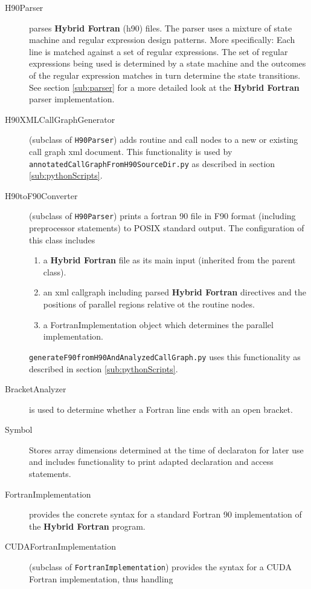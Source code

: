 \begin{description}
 \item[H90Parser] parses \textbf{Hybrid Fortran} (h90) files. The parser uses a mixture of state machine and regular expression design patterns. More specifically: Each line is matched against a set of regular expressions. The set of regular expressions being used is determined by a state machine and the outcomes of the regular expression matches in turn determine the state transitions.
 See section \ref{sub:parser} for a more detailed look at the \textbf{Hybrid Fortran} parser implementation.
 \item[H90XMLCallGraphGenerator] (subclass of \verb|H90Parser|) adds routine and call nodes to a new or existing call graph xml document. This functionality is used by \linebreak
 \verb|annotatedCallGraphFromH90SourceDir.py| as described in section \ref{sub:pythonScripts}.
 \item[H90toF90Converter] (subclass of \verb|H90Parser|) prints a fortran 90 file in F90 format (including preprocessor statements) to POSIX standard output. The configuration of this class includes
  \begin{enumerate}
    \item a \textbf{Hybrid Fortran} file as its main input (inherited from the parent class).
    \item an xml callgraph including parsed \textbf{Hybrid Fortran} directives and the positions of parallel regions relative ot the routine nodes.
    \item a FortranImplementation object which determines the parallel implementation.
  \end{enumerate}
  \verb|generateF90fromH90AndAnalyzedCallGraph.py| uses this functionality as described in section \ref{sub:pythonScripts}.
 \item[BracketAnalyzer] is used to determine whether a Fortran line ends with an open bracket.
 \item[Symbol] Stores array dimensions determined at the time of declaraton for later use and includes functionality to print adapted declaration and access statements.
 \item[FortranImplementation] provides the concrete syntax for a standard Fortran 90 implementation of the \textbf{Hybrid Fortran} program.
 \item[CUDAFortranImplementation] (subclass of \verb|FortranImplementation|) provides the syntax for a CUDA Fortran implementation, thus handling
 \begin{itemize}

\end{itemize}
\end{description}

